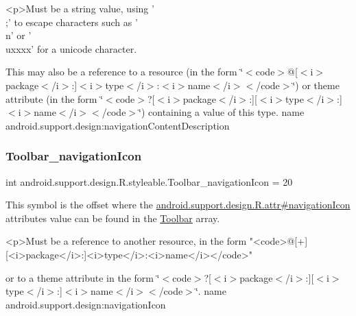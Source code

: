 \begin{DoxyVerb}      <p>Must be a string value, using '\\;' to escape characters such as '\\n' or '\\uxxxx' for a unicode character.
\end{DoxyVerb}
 

This may also be a reference to a resource (in the form \char`\"{}$<$code$>$@\mbox{[}$<$i$>$package$<$/i$>$\+:\mbox{]}$<$i$>$type$<$/i$>$\+:$<$i$>$name$<$/i$>$$<$/code$>$\char`\"{}) or theme attribute (in the form \char`\"{}$<$code$>$?\mbox{[}$<$i$>$package$<$/i$>$\+:\mbox{]}\mbox{[}$<$i$>$type$<$/i$>$\+:\mbox{]}$<$i$>$name$<$/i$>$$<$/code$>$\char`\"{}) containing a value of this type.  name android.\+support.\+design\+:navigation\+Content\+Description \mbox{\label{classandroid_1_1support_1_1design_1_1R_1_1styleable_afd9054878cb1ec4c07888ebaf463242c}} 
\subsubsection{\texorpdfstring{Toolbar\+\_\+navigation\+Icon}{Toolbar\_navigationIcon}}
{\footnotesize\ttfamily int android.\+support.\+design.\+R.\+styleable.\+Toolbar\+\_\+navigation\+Icon = 20\hspace{0.3cm}{\ttfamily [static]}}

This symbol is the offset where the \hyperlink{classandroid_1_1support_1_1design_1_1R_1_1attr_a9ae2a9f1ec65d153e45bcda69eadbcf2}{android.\+support.\+design.\+R.\+attr\#navigation\+Icon} attribute\textquotesingle{}s value can be found in the \hyperlink{classandroid_1_1support_1_1design_1_1R_1_1styleable_a7783ebe780dbe2a845802a40519a46e9}{Toolbar} array.

\begin{DoxyVerb}      <p>Must be a reference to another resource, in the form "<code>@[+][<i>package</i>:]<i>type</i>:<i>name</i></code>"
\end{DoxyVerb}
 or to a theme attribute in the form \char`\"{}$<$code$>$?\mbox{[}$<$i$>$package$<$/i$>$\+:\mbox{]}\mbox{[}$<$i$>$type$<$/i$>$\+:\mbox{]}$<$i$>$name$<$/i$>$$<$/code$>$\char`\"{}.  name android.\+support.\+design\+:navigation\+Icon \mbox{\label{classandroid_1_1support_1_1design_1_1R_1_1styleable_aa248f853ab7158fb2c598abe10eab5c8}} 
